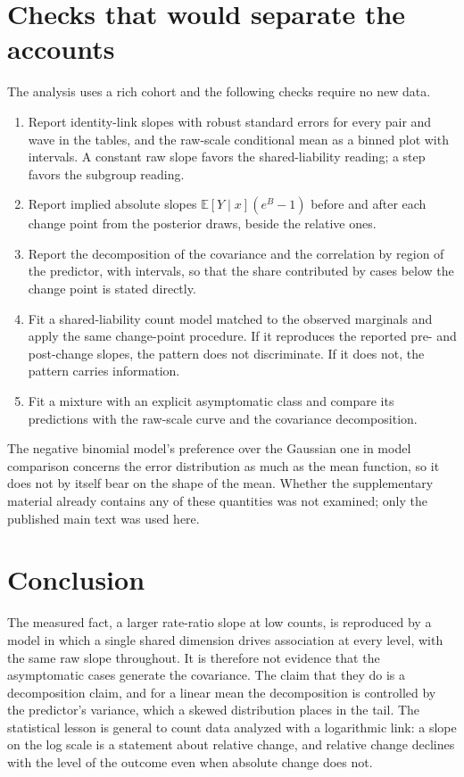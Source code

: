 \documentclass[11pt]{article}
\theoremstyle{definition}
\newcommand{\E}{\mathbb{E}}
\begin{document}
\section{Checks that would separate the accounts}

The analysis uses a rich cohort and the following checks require no new data.
\begin{enumerate}
\item Report identity-link slopes with robust standard errors for every pair and wave in the tables, and the raw-scale conditional mean as a binned plot with intervals. A constant raw slope favors the shared-liability reading; a step favors the subgroup reading.
\item Report implied absolute slopes $\E[Y\mid x](e^{B}-1)$ before and after each change point from the posterior draws, beside the relative ones.
\item Report the decomposition of the covariance and the correlation by region of the predictor, with intervals, so that the share contributed by cases below the change point is stated directly.
\item Fit a shared-liability count model matched to the observed marginals and apply the same change-point procedure. If it reproduces the reported pre- and post-change slopes, the pattern does not discriminate. If it does not, the pattern carries information.
\item Fit a mixture with an explicit asymptomatic class and compare its predictions with the raw-scale curve and the covariance decomposition.
\end{enumerate}
The negative binomial model's preference over the Gaussian one in model comparison concerns the error distribution as much as the mean function, so it does not by itself bear on the shape of the mean. Whether the supplementary material already contains any of these quantities was not examined; only the published main text was used here.

\section{Conclusion}

The measured fact, a larger rate-ratio slope at low counts, is reproduced by a model in which a single shared dimension drives association at every level, with the same raw slope throughout. It is therefore not evidence that the asymptomatic cases generate the covariance. The claim that they do is a decomposition claim, and for a linear mean the decomposition is controlled by the predictor's variance, which a skewed distribution places in the tail. The statistical lesson is general to count data analyzed with a logarithmic link: a slope on the log scale is a statement about relative change, and relative change declines with the level of the outcome even when absolute change does not.
\end{document}
